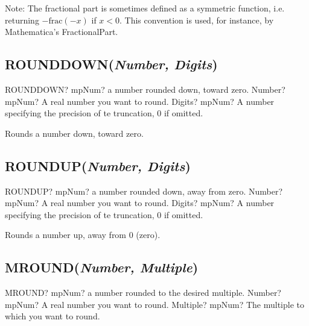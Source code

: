 Note: The fractional part is sometimes defined as a symmetric function, i.e. returning $-\text{frac}(-x)$ if $x<0$. This convention is used, for instance, by Mathematica’s FractionalPart.




\subsection{ROUNDDOWN(\textit{Number, Digits})}

\begin{mpFunctionsExtract}
	\mpWorksheetFunctionTwoNotImplemented
	{ROUNDDOWN? mpNum? a number rounded down, toward zero.}
	{Number? mpNum? A real number you want to round.}
	{Digits? mpNum? A number specifying the precision of te truncation, 0 if omitted.}
\end{mpFunctionsExtract}

\vspace{0.3cm}
Rounds a number down, toward zero.





\subsection{ROUNDUP(\textit{Number, Digits})}

\begin{mpFunctionsExtract}
	\mpWorksheetFunctionTwoNotImplemented
	{ROUNDUP? mpNum? a number rounded down, away from zero.}
	{Number? mpNum? A real number you want to round.}
	{Digits? mpNum? A number specifying the precision of te truncation, 0 if omitted.}
\end{mpFunctionsExtract}

\vspace{0.3cm}
Rounds a number up, away from 0 (zero).




\subsection{MROUND(\textit{Number, Multiple})}

\begin{mpFunctionsExtract}
	\mpWorksheetFunctionTwoNotImplemented
	{MROUND? mpNum? a number rounded to the desired multiple.}
	{Number? mpNum? A real number you want to round.}
	{Multiple? mpNum? The multiple to which you want to round.}
\end{mpFunctionsExtract}

